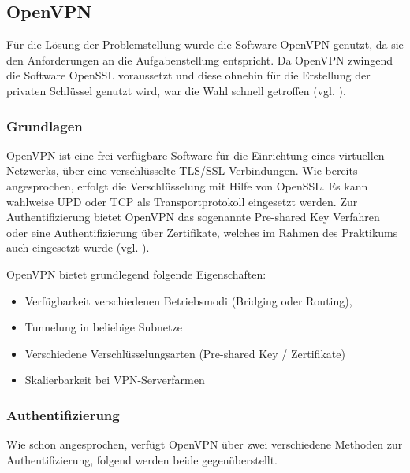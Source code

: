 \documentclass[
a4paper,     %
 headsepline, %
footsepline, %
titlepage,   %
 halfparskip,     %
 fleqn,       %
12pt         %
]{scrartcl}  %
\begin{document}
\subsection{OpenVPN}\label{openvpn}

Für die Lösung der Problemstellung wurde die Software OpenVPN genutzt, da sie den Anforderungen an die Aufgabenstellung entspricht. Da OpenVPN zwingend die Software OpenSSL voraussetzt und diese ohnehin für die Erstellung der privaten Schlüssel genutzt wird, war die Wahl schnell getroffen (vgl. \cite{openV-1}). 

\subsubsection{Grundlagen}
OpenVPN ist eine frei verfügbare Software für die Einrichtung eines virtuellen Netzwerks, über eine verschlüsselte TLS/SSL-Verbindungen. Wie bereits angesprochen, erfolgt die Verschlüsselung mit Hilfe von OpenSSL. Es kann wahlweise UPD oder TCP als Transportprotokoll eingesetzt werden. Zur Authentifizierung bietet OpenVPN das sogenannte Pre-shared Key Verfahren oder eine Authentifizierung über Zertifikate, welches im Rahmen des Praktikums auch eingesetzt wurde (vgl. \cite{openV-1}). 

OpenVPN bietet grundlegend folgende Eigenschaften:

\begin{itemize}
\item Verfügbarkeit verschiedenen Betriebsmodi (Bridging oder Routing),
\item Tunnelung in beliebige Subnetze 
\item Verschiedene Verschlüsselungsarten (Pre-shared Key / Zertifikate)
\item Skalierbarkeit bei VPN-Serverfarmen
\end{itemize}

\subsubsection{Authentifizierung}
Wie schon angesprochen, verfügt OpenVPN über zwei verschiedene Methoden zur Authentifizierung, folgend werden beide gegenüberstellt. 
\end{document}
